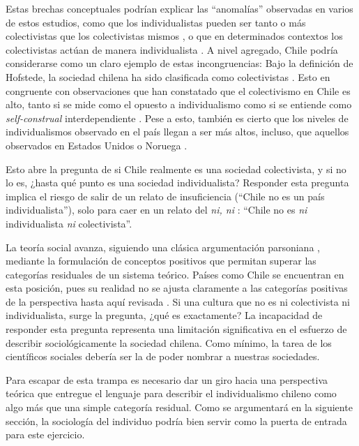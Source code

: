 \documentclass[12pt,twoside]{templates/facsothesis}
\begin{document}
Estas brechas conceptuales podrían explicar las ``anomalías'' observadas en varios de estos estudios, como que los individualistas pueden ser tanto o más colectivistas que los colectivistas mismos \citep{oyserman2002}, o que en determinados contextos los colectivistas actúan de manera individualista \citep{voronov2002}. A nivel agregado, Chile podría considerarse como un claro ejemplo de estas incongruencias: Bajo la definición de Hofstede, la sociedad chilena ha sido clasificada como colectivistas \citep{rojas2008}. Esto en congruente con observaciones que han constatado que el colectivismo en Chile es alto, tanto si se mide como el opuesto a individualismo \citep{oyserman2002} como si se entiende como \emph{self-construal} interdependiente \citep{benavides2020}. Pese a esto, también es cierto que los niveles de individualismos observado en el país llegan a ser más altos, incluso, que aquellos observados en Estados Unidos \citep{oyserman2002} o Noruega \citep{kolstad2009}.

Esto abre la pregunta de si Chile realmente es una sociedad colectivista, y si no lo es, ¿hasta qué punto es una sociedad individualista? Responder esta pregunta implica el riesgo de salir de un relato de insuficiencia (``Chile no es un país individualista''), solo para caer en un relato del \emph{ni, ni} \citep{martuccelli2010}: ``Chile no es \emph{ni} individualista \emph{ni} colectivista''.

La teoría social avanza, siguiendo una clásica argumentación parsoniana \citep{bouzanis2019}, mediante la formulación de conceptos positivos que permitan superar las categorías residuales de un sistema teórico. Países como Chile se encuentran en esta posición, pues su realidad no se ajusta claramente a las categorías positivas de la perspectiva hasta aquí revisada \citep{bouzanis2019}. Si una cultura que no es ni colectivista ni individualista, surge la pregunta, ¿qué es exactamente? La incapacidad de responder esta pregunta representa una limitación significativa en el esfuerzo de describir sociológicamente la sociedad chilena. Como mínimo, la tarea de los científicos sociales debería ser la de poder nombrar a nuestras sociedades.

Para escapar de esta trampa es necesario dar un giro hacia una perspectiva teórica que entregue el lenguaje para describir el individualismo chileno como algo más que una simple categoría residual. Como se argumentará en la siguiente sección, la sociología del individuo podría bien servir como la puerta de entrada para este ejercicio.
\end{document}
